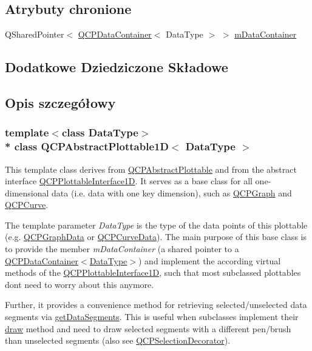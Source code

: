 \subsection*{Atrybuty chronione}
\begin{DoxyCompactItemize}
\item 
Q\+Shared\+Pointer$<$ \hyperlink{class_q_c_p_data_container}{Q\+C\+P\+Data\+Container}$<$ Data\+Type $>$ $>$ \hyperlink{class_q_c_p_abstract_plottable1_d_ac139cf70590707a1fb40eabe97fac246}{m\+Data\+Container}
\end{DoxyCompactItemize}
\subsection*{Dodatkowe Dziedziczone Składowe}


\subsection{Opis szczegółowy}
\subsubsection*{template$<$class Data\+Type$>$\\*
class Q\+C\+P\+Abstract\+Plottable1\+D$<$ Data\+Type $>$}

This template class derives from \hyperlink{class_q_c_p_abstract_plottable}{Q\+C\+P\+Abstract\+Plottable} and from the abstract interface \hyperlink{class_q_c_p_plottable_interface1_d}{Q\+C\+P\+Plottable\+Interface1D}. It serves as a base class for all one-\/dimensional data (i.\+e. data with one key dimension), such as \hyperlink{class_q_c_p_graph}{Q\+C\+P\+Graph} and \hyperlink{class_q_c_p_curve}{Q\+C\+P\+Curve}.

The template parameter {\itshape Data\+Type} is the type of the data points of this plottable (e.\+g. \hyperlink{class_q_c_p_graph_data}{Q\+C\+P\+Graph\+Data} or \hyperlink{class_q_c_p_curve_data}{Q\+C\+P\+Curve\+Data}). The main purpose of this base class is to provide the member {\itshape m\+Data\+Container} (a shared pointer to a \hyperlink{class_q_c_p_data_container}{Q\+C\+P\+Data\+Container$<$Data\+Type$>$}) and implement the according virtual methods of the \hyperlink{class_q_c_p_plottable_interface1_d}{Q\+C\+P\+Plottable\+Interface1D}, such that most subclassed plottables don\textquotesingle{}t need to worry about this anymore.

Further, it provides a convenience method for retrieving selected/unselected data segments via \hyperlink{class_q_c_p_abstract_plottable1_d_a966cb165fb1dfc561d923dc6f8b149ea}{get\+Data\+Segments}. This is useful when subclasses implement their \hyperlink{class_q_c_p_abstract_plottable_a453f676a5cee7bf846c5f0fa05ea84b3}{draw} method and need to draw selected segments with a different pen/brush than unselected segments (also see \hyperlink{class_q_c_p_selection_decorator}{Q\+C\+P\+Selection\+Decorator}).


